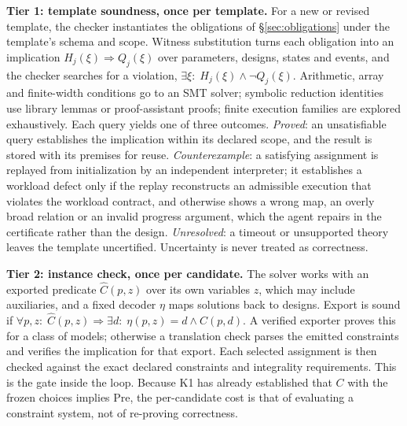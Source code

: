 \documentclass[11pt]{article}
\begin{document}
\textbf{Tier 1: template soundness, once per template.} For a new or revised template, the checker instantiates the obligations of §\ref{sec:obligations} under the template's schema and scope. Witness substitution turns each obligation into an implication \(H_j(\xi)\Rightarrow Q_j(\xi)\) over parameters, designs, states and events, and the checker searches for a violation, \(\exists\xi:\;H_j(\xi)\land\neg Q_j(\xi)\). Arithmetic, array and finite-width conditions go to an SMT solver; symbolic reduction identities use library lemmas or proof-assistant proofs; finite execution families are explored exhaustively. Each query yields one of three outcomes. \emph{Proved}: an unsatisfiable query establishes the implication within its declared scope, and the result is stored with its premises for reuse. \emph{Counterexample}: a satisfying assignment is replayed from initialization by an independent interpreter; it establishes a workload defect only if the replay reconstructs an admissible execution that violates the workload contract, and otherwise shows a wrong map, an overly broad relation or an invalid progress argument, which the agent repairs in the certificate rather than the design. \emph{Unresolved}: a timeout or unsupported theory leaves the template uncertified. Uncertainty is never treated as correctness.

\textbf{Tier 2: instance check, once per candidate.} The solver works with an exported predicate \(\widehat C(p,z)\) over its own variables \(z\), which may include auxiliaries, and a fixed decoder \(\eta\) maps solutions back to designs. Export is sound if \(\forall p,z:\;\widehat C(p,z)\Rightarrow\exists d:\;\eta(p,z)=d\land C(p,d)\). A verified exporter proves this for a class of models; otherwise a translation check parses the emitted constraints and verifies the implication for that export. Each selected assignment is then checked against the exact declared constraints and integrality requirements. This is the gate inside the loop. Because K1 has already established that \(C\) with the frozen choices implies \(\mathrm{Pre}\), the per-candidate cost is that of evaluating a constraint system, not of re-proving correctness.
\end{document}

